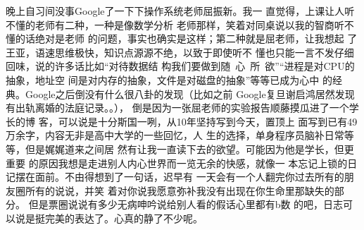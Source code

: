 晚上自习间没事Google了一下下操作系统老师屈振新。我一
直觉得，上课让人听不懂的老师有二种，一种是像数学分析
老师那样，笑着对同桌说以我的智商听不懂的话绝对是老师
的问题，事实也确实是这样；第二种就是屈老师，让我想起
了王亚，语速思维极快，知识点源源不绝，以致于即使听不
懂也只能一言不发仔细回味，说的许多话比如“对待数据结
构我们要做到随~心~所~欲”“进程是对CPU的抽象，地址空
间是对内存的抽象，文件是对磁盘的抽象”等等已成为心中
的经典。Google之后倒没有什么很八卦的发现（比如之前
Google复旦谢启鸿居然发现有出轨离婚的法庭记录。。），
倒是因为一张屈老师的实验报告顺藤摸瓜进了一个学长的博
客，可以说是十分斯国一咧，从10年坚持写到今天，置顶上
面写到已有49万余字，内容无非是高中大学的一些回忆，人
生的选择，单身程序员脑补日常等等，但是娓娓道来之间居
然有让我一直读下去的欲望。可能因为他是学长，但更重要
的原因我想是走进别人内心世界而一览无余的快感，就像一
本忘记上锁的日记摆在面前。不由得想到了一句话，迟早有
一天会有一个人翻完你过去所有的朋友圈所有的说说，并笑
着对你说我愿意弥补我没有出现在你生命里那缺失的部分。
但是票圈说说有多少无病呻吟说给别人看的假话心里都有b数
的吧，日志可以说是挺完美的表达了。心真的静了不少呢。
